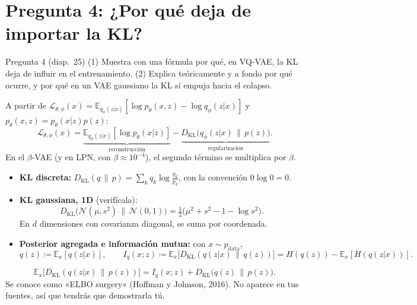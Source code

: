 \documentclass[11pt,a4paper]{article}
\newcommand{\KL}{D_{\mathrm{KL}}}
\newcommand{\E}{\mathbb{E}}
\newcommand{\N}{\mathcal{N}}
\begin{document}
\newpage
\section*{Pregunta 4: ¿Por qué deja de importar la KL?}

\begin{enunciado}{Pregunta 4 (diap.~25)}
(1) Muestra con una fórmula por qué, en VQ-VAE, la KL deja de influir en el entrenamiento.
(2) Explica teóricamente y a fondo por qué ocurre, y por qué en un VAE gaussiano la KL sí empuja hacia el colapso.
\end{enunciado}

\begin{definicion}
A partir de $\mathcal L_{\theta,\phi}(x)=\E_{q_\phi(z|x)}[\log p_\theta(x,z)-\log q_\phi(z|x)]$ y $p_\theta(x,z)=p_\theta(x|z)p(z)$:
\[ \mathcal L_{\theta,\phi}(x)=\underbrace{\E_{q_\phi(z|x)}[\log p_\theta(x|z)]}_{\text{reconstrucción}}-\underbrace{\KL\big(q_\phi(z|x)\,\|\,p(z)\big)}_{\text{regularización}}. \]
En el $\beta$-VAE (y en LPN, con $\beta\approx10^{-4}$), el segundo término se multiplica por $\beta$.
\end{definicion}

\begin{herramienta}
\begin{itemize}[leftmargin=*]
  \item \textbf{KL discreta:} $\KL(q\,\|\,p)=\sum_k q_k\log\frac{q_k}{p_k}$, con la convención $0\log 0=0$.
  \item \textbf{KL gaussiana, 1D} (verifícala):
  \[ \KL\big(\N(\mu,s^2)\,\|\,\N(0,1)\big)=\tfrac12\big(\mu^2+s^2-1-\log s^2\big). \]
  En $d$ dimensiones con covarianza diagonal, se suma por coordenada.
  \item \textbf{Posterior agregada e información mutua:} con $x\sim p_{\mathrm{data}}$,
  \[ q(z)\coloneqq\E_{x}[q(z|x)],\qquad I_q(x;z)\coloneqq\E_x\big[\KL(q(z|x)\,\|\,q(z))\big]=H(q(z))-\E_x[H(q(z|x))]. \]
\end{itemize}
\end{herramienta}

\begin{definicion}
\[ \E_x\big[\KL(q(z|x)\,\|\,p(z))\big]=I_q(x;z)+\KL\big(q(z)\,\|\,p(z)\big). \]
Se conoce como «ELBO surgery» (Hoffman y Johnson, 2016). No aparece en tus fuentes, así que tendrás que demostrarla tú.
\end{definicion}
\end{document}
